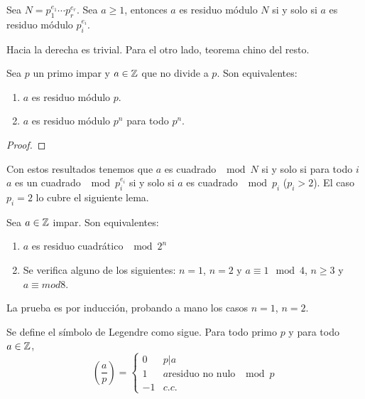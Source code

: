 \documentclass[CR.tex]{subfiles}
\begin{document}
\begin{prop}
Sea $N=p_1^{e_1}\cdots p_r^{e_r}$. Sea $a\geq 1$, entonces $a$ es residuo módulo $N$ si y solo si $a$ es residuo módulo $p_i^{e_i}$. 
\end{prop}
\begin{dem}
Hacia la derecha es trivial. Para el otro lado, teorema chino del resto.
\end{dem}

\begin{lemma}
Sea $p$ un primo impar y $a\in\mathbb{Z}$ que no divide a $p$. Son equivalentes:
\begin{enumerate}
\item $a$ es residuo módulo $p$.
\item $a$ es residuo módulo $p^n$ para todo $p^n$. 
\end{enumerate}
\end{lemma}
\begin{proof}

\end{proof}

Con estos resultados tenemos que $a$ es cuadrado $\mod N$ si y solo si para todo $i$ $a$ es un cuadrado $\mod p_i^{e_i}$ si y solo si $a$ es cuadrado $\mod  p_i$ ($p_i>2$). El caso $p_i=2$ lo cubre el siguiente lema.

\begin{lemma}
Sea $a\in\mathbb{Z}$ impar. Son equivalentes:
\begin{enumerate}
\item $a$ es residuo cuadrático $\mod 2^n$
\item Se verifica alguno de los siguientes: $n=1$, $n=2$ y $a\equiv 1\mod 4$, $n\geq 3$ y $a\equiv mod 8$.
\end{enumerate}
\end{lemma}
La prueba es por inducción, probando a mano los casos $n=1$, $n=2$. 

\begin{defi}
Se define el símbolo de Legendre como sigue. Para todo primo $p$ y para todo $a\in\mathbb{Z}$, 
$$\left(\frac{a}{p}\right)=\begin{cases}
0 & p|a\\
1 & a \text{residuo no nulo }\mod p\\
-1 & c.c.
\end{cases}$$
\end{defi}
\end{document}
